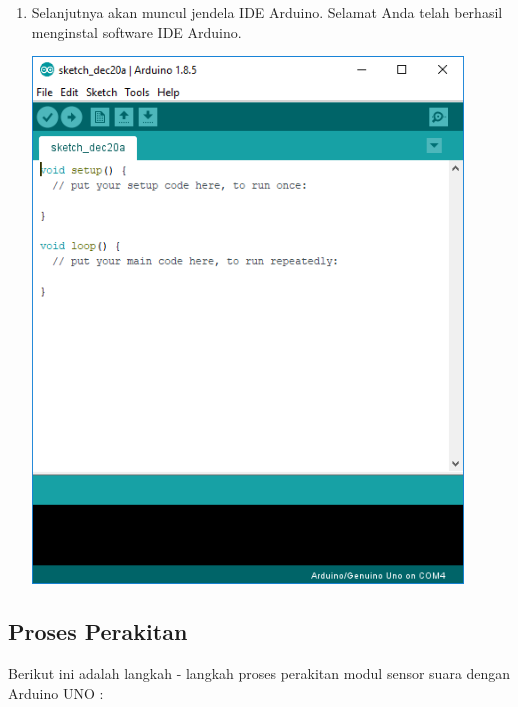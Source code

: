 \begin{enumerate}
\item Selanjutnya akan muncul jendela IDE Arduino. Selamat Anda telah berhasil menginstal software IDE Arduino.
\break\\
\centerline{\includegraphics[width=0.9\textwidth]{figures/aride12.png}}
\end{enumerate}

\subsection{Proses Perakitan}

Berikut ini adalah langkah - langkah proses perakitan modul sensor suara dengan Arduino UNO :

